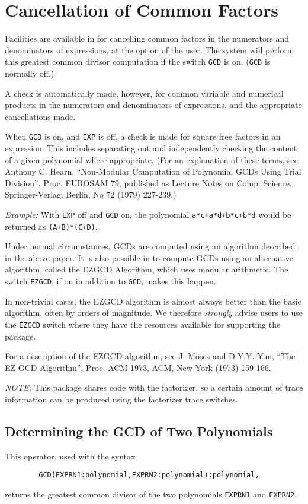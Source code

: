\section{Cancellation of Common Factors}
\hypertarget{switch:GCD}{}
Facilities are available in {\REDUCE} for cancelling common factors in the
numerators and denominators of expressions, at the option of the user. The
system will perform this greatest common divisor computation if the switch
{\tt GCD} is on. ({\tt GCD} is normally off.)

A check is automatically made, however, for common variable and numerical
products in the numerators and denominators of expressions, and the
appropriate cancellations made.

When {\tt GCD} is on, and {\tt EXP} is off, a check is made for square
free factors in an expression.  This includes separating out and
independently checking the content of a given polynomial where
appropriate. (For an explanation of these terms, see Anthony C. Hearn,
``Non-Modular Computation of Polynomial GCDs Using Trial Division'', Proc.
EUROSAM 79, published as Lecture Notes on Comp.  Science, Springer-Verlag,
Berlin, No 72 (1979) 227-239.)

{\it Example:} With {\tt EXP} off and {\tt GCD}
on,
the polynomial {\tt a*c+a*d+b*c+b*d} would be returned as {\tt (A+B)*(C+D)}.

\hypertarget{switch:EZGCD}{}
Under normal circumstances, GCDs are computed using an algorithm described
in the above paper. It is also possible in {\REDUCE} to compute GCDs using
an alternative algorithm, called the EZGCD Algorithm, which uses modular
arithmetic.  The switch {\tt EZGCD}, if on in addition to
{\tt GCD}, makes this happen.

In non-trivial cases, the EZGCD algorithm is almost always better
than the basic algorithm, often by orders of magnitude.  We therefore
{\em strongly\/} advise users to use the {\tt EZGCD} switch where they have the
resources available for supporting the package.

For a description of the EZGCD algorithm, see J. Moses and D.Y.Y. Yun,
``The EZ GCD Algorithm'', Proc. ACM 1973, ACM, New York (1973) 159-166.

{\it NOTE:}
This package shares code with the factorizer, so a certain amount of trace
information can be produced using the factorizer trace switches.

\subsection{Determining the GCD of Two Polynomials}
\hypertarget{operator:GCD}{}
This operator, used with the syntax
\begin{verbatim}
        GCD(EXPRN1:polynomial,EXPRN2:polynomial):polynomial,
\end{verbatim}
returns the greatest common divisor of the two polynomials {\tt EXPRN1} and
{\tt EXPRN2}.

